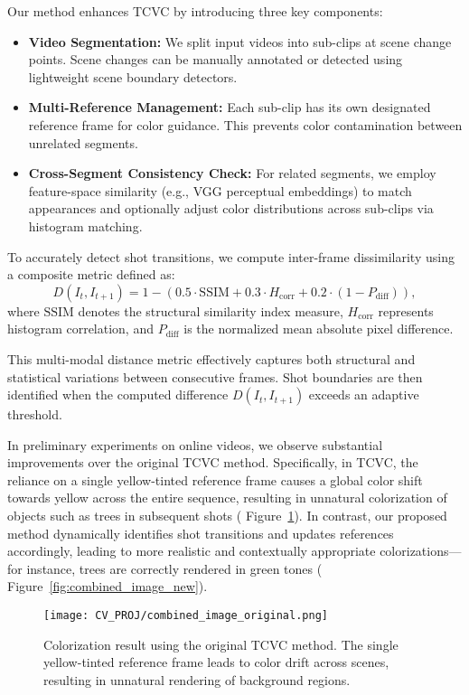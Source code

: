 \documentclass[10pt,twocolumn,letterpaper]{article}
\begin{document}
Our method enhances TCVC by introducing three key components:
\begin{itemize}
    \item \textbf{Video Segmentation:} We split input videos into sub-clips at scene change points. Scene changes can be manually annotated or detected using lightweight scene boundary detectors.
    \item \textbf{Multi-Reference Management:} Each sub-clip has its own designated reference frame for color guidance. This prevents color contamination between unrelated segments.
    \item \textbf{Cross-Segment Consistency Check:} For related segments, we employ feature-space similarity (e.g., VGG perceptual embeddings) to match appearances and optionally adjust color distributions across sub-clips via histogram matching.
\end{itemize}

To accurately detect shot transitions, we compute inter-frame dissimilarity using a composite metric defined as: \begin{equation} D(I_t, I_{t+1}) = 1 - (0.5 \cdot \text{SSIM} + 0.3 \cdot H_{\text{corr}} + 0.2 \cdot (1 - P_{\text{diff}})), \end{equation} where $\text{SSIM}$ denotes the structural similarity index measure, $H_{\text{corr}}$ represents histogram correlation, and $P_{\text{diff}}$ is the normalized mean absolute pixel difference.

This multi-modal distance metric effectively captures both structural and statistical variations between consecutive frames. Shot boundaries are then identified when the computed difference $D(I_t, I_{t+1})$ exceeds an adaptive threshold.

In preliminary experiments on online videos, we observe substantial improvements over the original TCVC method. Specifically, in TCVC, the reliance on a single yellow-tinted reference frame causes a global color shift towards yellow across the entire sequence, resulting in unnatural colorization of objects such as trees in subsequent shots ( Figure~\ref{fig:combined_image_original}). In contrast, our proposed method dynamically identifies shot transitions and updates references accordingly, leading to more realistic and contextually appropriate colorizations—for instance, trees are correctly rendered in green tones ( Figure~\ref{fig:combined_image_new}).

\begin{figure}[ht]
    \centering
    \texttt{[image: CV\_PROJ/combined\_image\_original.png]}
    \caption{Colorization result using the original TCVC method. The single yellow-tinted reference frame leads to color drift across scenes, resulting in unnatural rendering of background regions.}

    \label{fig:combined_image_original}
\end{figure}
\end{document}
